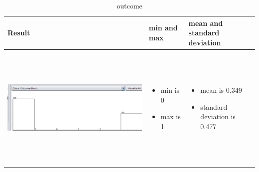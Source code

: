 \documentclass{article}
\begin{document}
\begin{table}[h!]
  \centering
  \begin{tabular}{ | m{5 cm} | m{3cm} | m{3cm} | }
    \hline
   Result &  min and max & mean and standard deviation \\ \hline
    \begin{minipage}{.3\textwidth}
      \includegraphics[width=\linewidth, height=60mm]{outcome.png}
    \end{minipage}
    &
      \begin{itemize}
        \item  min is 0
        \item max is 1
          
      \end{itemize}
    & 
      \begin{itemize}
        \item  mean is 0.349
        \item  standard deviation is 0.477  
          
      \end{itemize}
    \\ \hline
  \end{tabular}
  \caption{ outcome }\label{tbl:myLboro}
\end{table}
\end{document}
